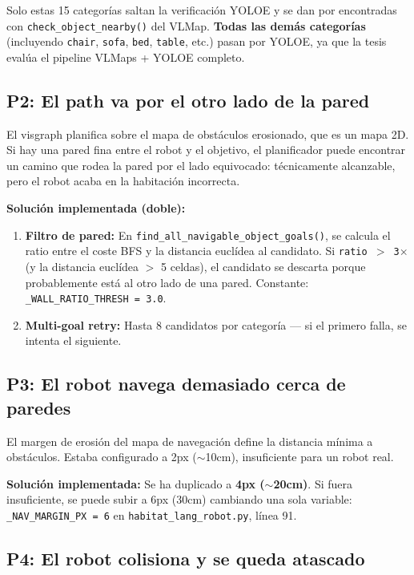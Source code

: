 \documentclass[11pt,a4paper]{article}
\begin{document}
Solo estas 15 categorías saltan la verificación YOLOE y se dan por encontradas con \texttt{check\_object\_nearby()} del VLMap. \textbf{Todas las demás categorías} (incluyendo \texttt{chair}, \texttt{sofa}, \texttt{bed}, \texttt{table}, etc.) pasan por YOLOE, ya que la tesis evalúa el pipeline VLMaps + YOLOE completo.

\subsection{P2: El path va por el otro lado de la pared}

El visgraph planifica sobre el mapa de obstáculos erosionado, que es un mapa 2D. Si hay una pared fina entre el robot y el objetivo, el planificador puede encontrar un camino que rodea la pared por el lado equivocado: técnicamente alcanzable, pero el robot acaba en la habitación incorrecta.

\textbf{Solución implementada (doble):}
\begin{enumerate}
    \item \textbf{Filtro de pared:} En \texttt{find\_all\_navigable\_object\_goals()}, se calcula el ratio entre el coste BFS y la distancia euclídea al candidato. Si \texttt{ratio $>$ 3$\times$} (y la distancia euclídea $>$ 5 celdas), el candidato se descarta porque probablemente está al otro lado de una pared. Constante: \texttt{\_WALL\_RATIO\_THRESH = 3.0}.
    \item \textbf{Multi-goal retry:} Hasta 8 candidatos por categoría --- si el primero falla, se intenta el siguiente.
\end{enumerate}

\subsection{P3: El robot navega demasiado cerca de paredes}

El margen de erosión del mapa de navegación define la distancia mínima a obstáculos. Estaba configurado a 2px ($\sim$10cm), insuficiente para un robot real.

\textbf{Solución implementada:} Se ha duplicado a \textbf{4px ($\sim$20cm)}. Si fuera insuficiente, se puede subir a 6px (30cm) cambiando una sola variable: \texttt{\_NAV\_MARGIN\_PX = 6} en \texttt{habitat\_lang\_robot.py}, línea 91.

\subsection{P4: El robot colisiona y se queda atascado}
\end{document}
